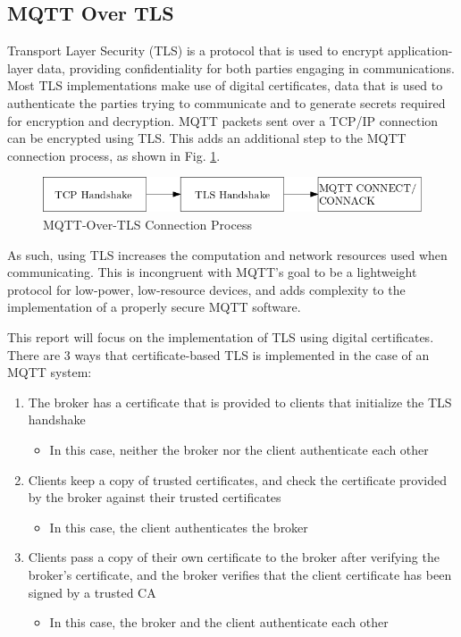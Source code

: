 \documentclass[12pt]{article}
\begin{document}
\subsection{MQTT Over TLS}
Transport Layer Security (TLS) is a protocol that is used to encrypt application-layer data, providing confidentiality for both parties engaging in communications. Most TLS implementations make use of digital certificates, data that is used to authenticate the parties trying to communicate and to generate secrets required for encryption and decryption. MQTT packets sent over a TCP/IP connection can be encrypted using TLS. This adds an additional step to the MQTT connection process, as shown in Fig. \ref{fig:connection}.\par
\begin{figure}[!htb]
\centering
	\includegraphics[scale=0.5]{tcp-tls-mqtt.png}
	\caption{MQTT-Over-TLS Connection Process\label{fig:connection}}
\end{figure}
As such, using TLS increases the computation and network resources used when communicating. This is incongruent with MQTT's goal to be a lightweight protocol for low-power, low-resource devices, and adds complexity to the implementation of a properly secure MQTT software.\par
This report will focus on the implementation of TLS using digital certificates. There are 3 ways that certificate-based TLS is implemented in the case of an MQTT system:
\begin{enumerate}
	\item The broker has a certificate that is provided to clients that initialize the TLS handshake
	\begin{itemize}
		\item In this case, neither the broker nor the client authenticate each other
	\end{itemize}
	\item Clients keep a copy of trusted certificates, and check the certificate provided by the broker against their trusted certificates
	\begin{itemize}
		\item In this case, the client authenticates the broker
	\end{itemize}
	\item Clients pass a copy of their own certificate to the broker after verifying the broker's certificate, and the broker verifies that the client certificate has been signed by a trusted CA
	\begin{itemize}
		\item In this case, the broker and the client authenticate each other
	\end{itemize}
\end{enumerate}
\end{document}
